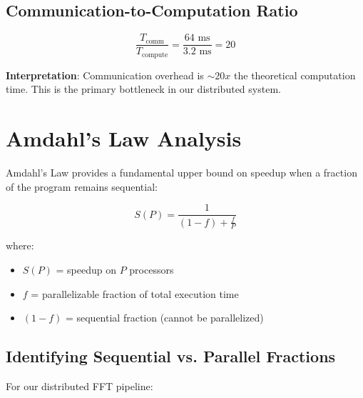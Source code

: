 \documentclass[11pt,a4paper]{article}
\theoremstyle{definition}
\begin{document}
\subsection{Communication-to-Computation Ratio}

\[
\frac{T_{\text{comm}}}{T_{\text{compute}}} = \frac{64 \text{ ms}}{3.2 \text{ ms}} = 20
\]

\textbf{Interpretation}: Communication overhead is $\sim 20x$ the theoretical computation time. This is the primary bottleneck in our distributed system.

\section{Amdahl's Law Analysis}

Amdahl's Law provides a fundamental upper bound on speedup when a fraction of the program remains sequential:

\[
S(P) = \frac{1}{(1-f) + \frac{f}{P}}
\]

where:
\begin{itemize}
    \item $S(P)$ = speedup on $P$ processors
    \item $f$ = parallelizable fraction of total execution time
    \item $(1-f)$ = sequential fraction (cannot be parallelized)
\end{itemize}

\subsection{Identifying Sequential vs. Parallel Fractions}

For our distributed FFT pipeline:
\end{document}
